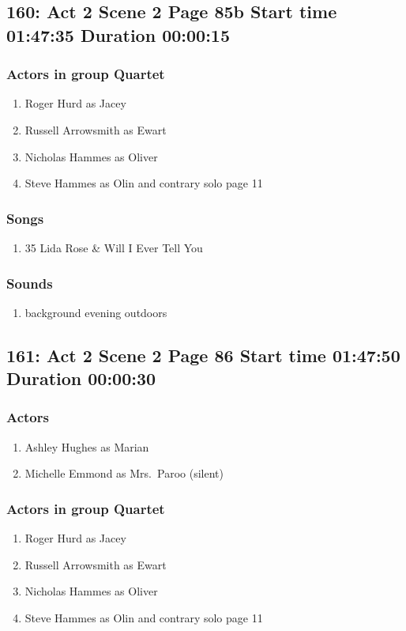 \subsection{160: Act 2 Scene 2 Page 85b Start time 01:47:35 Duration 00:00:15}

\subsubsection{Actors in group Quartet}
\begin{enumerate}
\item Roger Hurd as Jacey
\item Russell Arrowsmith as Ewart
\item Nicholas Hammes as Oliver
\item Steve Hammes as Olin and contrary solo page 11
\end{enumerate}

\subsubsection{Songs}
\begin{enumerate}
\item 35 Lida Rose \& Will I Ever Tell You
\end{enumerate}\subsubsection{Sounds}
\begin{enumerate}
\item background evening outdoors
\end{enumerate}
\subsection{161: Act 2 Scene 2 Page 86 Start time 01:47:50 Duration 00:00:30}

\subsubsection{Actors}
\begin{enumerate}
\item Ashley Hughes as Marian
\item Michelle Emmond as Mrs.~Paroo (silent)
\end{enumerate}
\subsubsection{Actors in group Quartet}
\begin{enumerate}
\item Roger Hurd as Jacey
\item Russell Arrowsmith as Ewart
\item Nicholas Hammes as Oliver
\item Steve Hammes as Olin and contrary solo page 11
\end{enumerate}

